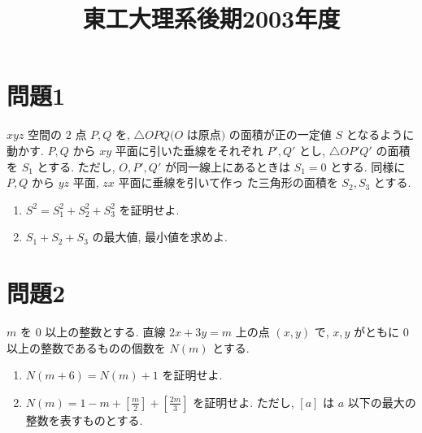 \documentclass[unicode,12pt, a4paper]{ltjsarticle}%
\title{東工大理系後期2003年度}
\begin{document}
\maketitle
\section{問題1}
$xyz$ 空間の $2$ 点 $P, Q$ を, $\triangle OPQ (O$ は原点$)$ の面積が正の一定値 $S$ となるように動かす. $P, Q$ から $xy$ 平面に引いた垂線をそれぞれ $P', Q'$ とし, $\triangle OP'Q'$ の面積を $S_1$ とする. ただし, $O, P', Q'$ が同一線上にあるときは $S_1=0$ とする. 同様に $P, Q$ から $yz$ 平面, $zx$ 平面に垂線を引いて作っ
た三角形の面積を $S_2, S_3$ とする.
    \begin{enumerate}
        \item $S^2 = S_1^2 + S_2^2 + S_3^2$ を証明せよ.
        \item $S_1+S_2+S_3$ の最大値, 最小値を求めよ.
    \end{enumerate}


\section{問題2}
$m$ を $0$ 以上の整数とする. 直線 $2x+3y=m$ 上の点 $(x,y)$ で, $x, y$ がともに $0$ 以上の整数であるものの個数を $N(m)$ とする.
    \begin{enumerate}
        \item $N(m+6)=N(m)+1$ を証明せよ.
        \item $N(m)=1-m+\left[\frac{m}{2}\right]+\left[\frac{2m}{3}\right]$ を証明せよ. ただし, $[a]$ は $a$ 以下の最大の整数を表すものとする.
    \end{enumerate}
\end{document}
